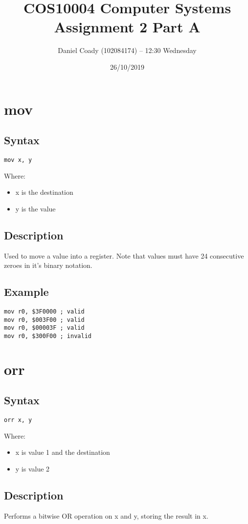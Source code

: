 \documentclass[11pt]{scrartcl}
\title{COS10004 Computer Systems Assignment 2 Part A}
\author{Daniel Coady (102084174) -- 12:30 Wednesday}
\date{26/10/2019}
\begin{document}
\maketitle

\pagebreak

\section{mov}
\subsection{Syntax}
\begin{verbatim}
mov x, y
\end{verbatim}
Where:
\begin{itemize}
    \item x is the destination
    \item y is the value
\end{itemize}
\subsection{Description}
Used to move a value into a register. Note that values must have 24
consecutive zeroes in it's binary notation.
\subsection{Example}
\begin{verbatim}
mov r0, $3F0000 ; valid
mov r0, $003F00 ; valid
mov r0, $00003F ; valid
mov r0, $300F00 ; invalid
\end{verbatim}

\section{orr}
\subsection{Syntax}
\begin{verbatim}
orr x, y
\end{verbatim}
Where:
\begin{itemize}
    \item x is value 1 and the destination
    \item y is value 2
\end{itemize}
\subsection{Description}
Performs a bitwise OR operation on x and y, storing the result in x.
\end{document}
